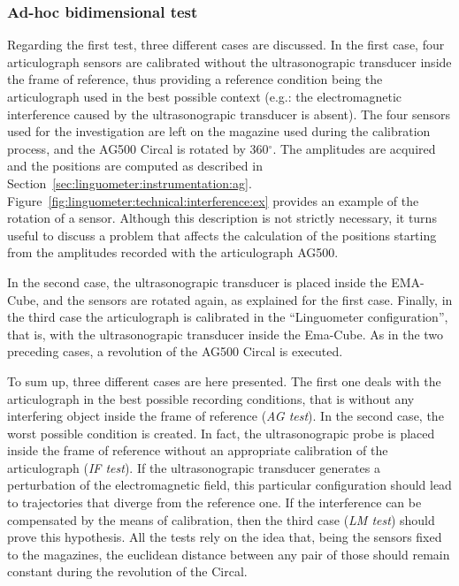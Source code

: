 \subsubsection{Ad-hoc bidimensional test}
Regarding the first test, three different cases are discussed.
In the first case, four articulograph sensors are calibrated without the 
ultrasonograpic transducer inside the frame of reference, thus
providing a reference condition being the articulograph used in the best
possible context (e.g.: the electromagnetic interference caused by the
ultrasonograpic transducer is absent).
The four sensors used for the investigation are left on the magazine used during
the calibration process, and the AG500 Circal is rotated by 360$^{\circ}$.
The amplitudes are acquired and the positions are computed as described in
Section~\ref{sec:linguometer:instrumentation:ag}.
Figure~\ref{fig:linguometer:technical:interference:ex} provides an example
of the rotation of a sensor.
Although this description is not strictly necessary, it turns useful to 
discuss a problem that affects the 
calculation of the positions starting from the amplitudes recorded with the
articulograph AG500.


In the second case, the ultrasonograpic transducer is placed inside the
EMA-Cube, and the sensors are rotated again, as explained for the first case.
Finally, in the third case the articulograph is calibrated in the ``Linguometer
configuration'', that is, with the ultrasonograpic transducer inside the
Ema-Cube.
As in the two preceding cases, a revolution of the AG500 Circal is executed.

To sum up, three different cases are here presented. 
The first one deals with the articulograph in the best possible recording
conditions, that is without any interfering object inside the frame of 
reference (\emph{AG test}).
In the second case, the worst possible condition is created. In fact, the
ultrasonograpic probe is placed inside the frame of reference without an
appropriate calibration of the articulograph (\emph{IF test}).
If the ultrasonograpic transducer generates a perturbation of the
electromagnetic field, this particular configuration should lead to 
trajectories that diverge from the reference one.
If the interference can be compensated by the means of calibration, then the
third case (\emph{LM test}) should prove this hypothesis.
All the tests rely on the idea that, being the sensors fixed to the magazines,
the euclidean distance between any pair of those should remain constant during
the revolution of the Circal.

